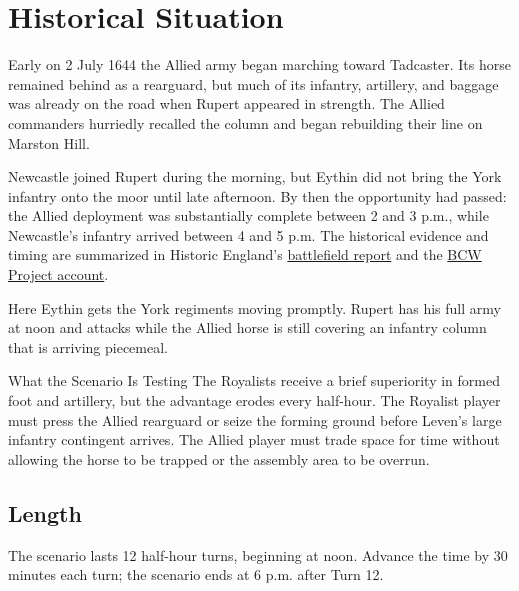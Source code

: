 \section{Historical Situation}

Early on 2 July 1644 the Allied army began marching toward Tadcaster. Its horse
remained behind as a rearguard, but much of its infantry, artillery, and baggage
was already on the road when Rupert appeared in strength. The Allied commanders
hurriedly recalled the column and began rebuilding their line on Marston Hill.

Newcastle joined Rupert during the morning, but Eythin did not bring the York
infantry onto the moor until late afternoon. By then the opportunity had passed:
the Allied deployment was substantially complete between 2 and 3 p.m., while
Newcastle's infantry arrived between 4 and 5 p.m. The historical evidence and
timing are summarized in Historic England's
\href{https://historicengland.org.uk/content/docs/listing/battlefields/marston-moor/}{battlefield report}
and the \href{https://bcw-project.org.uk/military/english-civil-war/northern-england/battle-of-marston-moor}{BCW Project account}.

Here Eythin gets the York regiments moving promptly. Rupert has his full army
at noon and attacks while the Allied horse is still covering an infantry column
that is arriving piecemeal.

\begin{scenarioBox}{What the Scenario Is Testing}
The Royalists receive a brief superiority in formed foot and artillery, but the
advantage erodes every half-hour. The Royalist player must press the Allied
rearguard or seize the forming ground before Leven's large infantry contingent
arrives. The Allied player must trade space for time without allowing the horse
to be trapped or the assembly area to be overrun.
\end{scenarioBox}

\subsection{Length}

The scenario lasts 12 half-hour turns, beginning at noon. Advance the time by
30 minutes each turn; the scenario ends at 6 p.m. after Turn 12.
